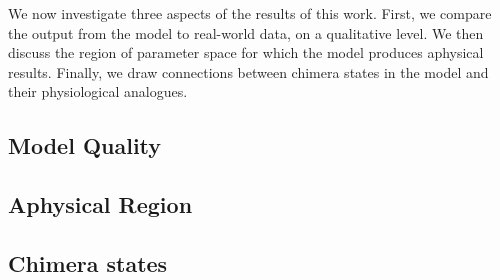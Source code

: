 We now investigate three aspects of the results of this work.
First, we compare the output from the model to real-world data, on a qualitative level.
We then discuss the region of parameter space for which the model produces aphysical results.
Finally, we draw connections between chimera states in the model and their physiological analogues.
\subsection{Model Quality}
\label{sec:results_model}


\subsection{Aphysical Region}
\label{sec:results_aphysical}


\subsection{Chimera states}
\label{sec:results_chimera}

